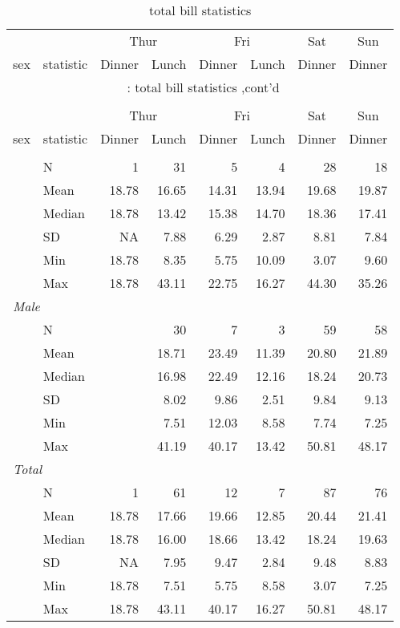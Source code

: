 \documentclass{article}
\begin{document}
\begin{longtable}{llrrrrrr}
\caption{total bill statistics}\\
\toprule
&&
\multicolumn{2}{c}{Thur}&\multicolumn{2}{c}{Fri}&\multicolumn{1}{c}{Sat}&\multicolumn{1}{c}{Sun} \\
\cmidrule(lr){3-4} \cmidrule(lr){5-6} \cmidrule(lr){7-7} \cmidrule(lr){8-8}
sex & statistic & Dinner & Lunch & Dinner & Lunch & Dinner & Dinner \\
\hline
\endfirsthead
\multicolumn{8}{c}{\tablename~\thetable{}: total bill statistics ,cont'd}\\\\
\toprule
&&
\multicolumn{2}{c}{Thur}&\multicolumn{2}{c}{Fri}&\multicolumn{1}{c}{Sat}&\multicolumn{1}{c}{Sun} \\
\cmidrule(lr){3-4} \cmidrule(lr){5-6} \cmidrule(lr){7-7} \cmidrule(lr){8-8}
sex & statistic & Dinner & Lunch & Dinner & Lunch & Dinner & Dinner \\
\hline
\endhead \hline \endfoot \hline

\endlastfoot
\multicolumn{ 7 }{l}{\textit{ Female }}\\
& N & 1 & 31 & 5 & 4 & 28 & 18 \\
 & Mean & 18.78 & 16.65 & 14.31 & 13.94 & 19.68 & 19.87 \\
 & Median & 18.78 & 13.42 & 15.38 & 14.70 & 18.36 & 17.41 \\
 & SD &  NA & 7.88 & 6.29 & 2.87 & 8.81 & 7.84 \\
 & Min & 18.78 & 8.35 & 5.75 & 10.09 & 3.07 & 9.60 \\
 & Max & 18.78 & 43.11 & 22.75 & 16.27 & 44.30 & 35.26 \\
\multicolumn{ 7 }{l}{\textit{ Male }}\\
& N &  & 30 & 7 & 3 & 59 & 58 \\
 & Mean &  & 18.71 & 23.49 & 11.39 & 20.80 & 21.89 \\
 & Median &  & 16.98 & 22.49 & 12.16 & 18.24 & 20.73 \\
 & SD &  & 8.02 & 9.86 & 2.51 & 9.84 & 9.13 \\
 & Min &  & 7.51 & 12.03 & 8.58 & 7.74 & 7.25 \\
 & Max &  & 41.19 & 40.17 & 13.42 & 50.81 & 48.17 \\
\multicolumn{ 7 }{l}{\textit{ Total }}\\
& N & 1 & 61 & 12 & 7 & 87 & 76 \\
 & Mean & 18.78 & 17.66 & 19.66 & 12.85 & 20.44 & 21.41 \\
 & Median & 18.78 & 16.00 & 18.66 & 13.42 & 18.24 & 19.63 \\
 & SD &  NA & 7.95 & 9.47 & 2.84 & 9.48 & 8.83 \\
 & Min & 18.78 & 7.51 & 5.75 & 8.58 & 3.07 & 7.25 \\
 & Max & 18.78 & 43.11 & 40.17 & 16.27 & 50.81 & 48.17 \\
\end{longtable}
\end{document}
